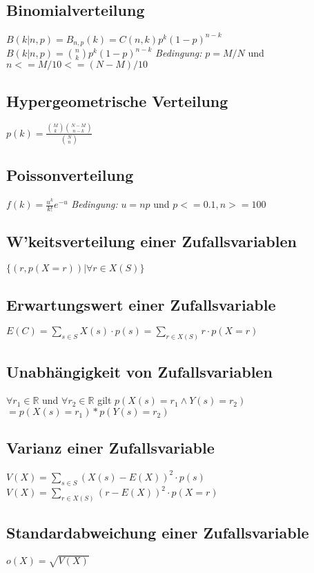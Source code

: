 \subsection{Binomialverteilung}
$ B(k|n, p) = B_{n,p}(k) = C(n, k) p^k (1-p)^{n-k} $
\newline
$ B(k|n, p) = \binom{n}{k} p^k (1-p)^{n-k} $
\newline
\newline
\textit{Bedingung:}
\newline
$ p = M/N $ und $ n <= M/10 <= (N - M) / 10 $

\subsection{Hypergeometrische Verteilung}
$ p(k) = \frac{\binom{M}{k} \binom{N-M}{n-k}}{\binom{N}{n}} $

\subsection{Poissonverteilung}
$ f(k) = \frac{u^k}{k!} e^{-u} $
\newline
\newline
\textit{Bedingung:}
\newline
$ u = np $ und $ p <= 0.1, n >= 100 $

\subsection{W'keitsverteilung einer Zufallsvariablen}
$ \{ (r, p(X = r)) | \forall r \in X(S) \} $

\subsection{Erwartungswert einer Zufallsvariable}
$ E(C) = \sum_{s \in S} X(s) \cdot p(s) = \sum_{r \in X(S)} r \cdot p(X = r) $

\subsection{Unabhängigkeit von Zufallsvariablen}
$\forall r_1 \in \mathbb{R} $ und $ \forall r_2 \in \mathbb{R} $ gilt $p(X(s) = r_1 \land Y(s) = r_2) $ \newline
$ = p(X(s) = r_1) * p(Y(s) = r_2) $

\subsection{Varianz einer Zufallsvariable}
$ V(X) = \sum_{s \in S} (X(s) - E(X))^2 \cdot p(s) $ 
\newline 
 $ V(X) = \sum_{r \in X(S)} (r - E(X))^2 \cdot p(X = r) $

\subsection{Standardabweichung einer Zufallsvariable}
$ o(X) = \sqrt{V(X)} $
